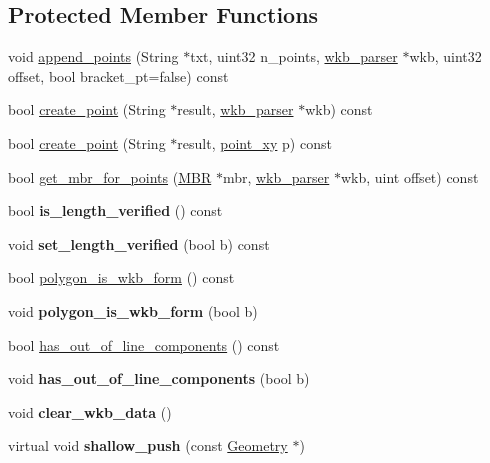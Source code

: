 \subsection*{Protected Member Functions}
\begin{DoxyCompactItemize}
\item 
void \mbox{\hyperlink{classGeometry_ad66be02e381cdb64b19e2b1e9072311f}{append\+\_\+points}} (String $\ast$txt, uint32 n\+\_\+points, \mbox{\hyperlink{classGeometry_1_1wkb__parser}{wkb\+\_\+parser}} $\ast$wkb, uint32 offset, bool bracket\+\_\+pt=false) const
\item 
bool \mbox{\hyperlink{classGeometry_a59686d5382a6cd3a691d18e24d2e2811}{create\+\_\+point}} (String $\ast$result, \mbox{\hyperlink{classGeometry_1_1wkb__parser}{wkb\+\_\+parser}} $\ast$wkb) const
\item 
bool \mbox{\hyperlink{classGeometry_ab2023acb5c6e5eaf434830c03a461072}{create\+\_\+point}} (String $\ast$result, \mbox{\hyperlink{classpoint__xy}{point\+\_\+xy}} p) const
\item 
bool \mbox{\hyperlink{classGeometry_a35ea9c1dd07e14bf7f414433e193461a}{get\+\_\+mbr\+\_\+for\+\_\+points}} (\mbox{\hyperlink{structMBR}{M\+BR}} $\ast$mbr, \mbox{\hyperlink{classGeometry_1_1wkb__parser}{wkb\+\_\+parser}} $\ast$wkb, uint offset) const
\item 
\mbox{\label{classGeometry_af9ad5d486b7b31a8289522b0d0612124}} 
bool {\bfseries is\+\_\+length\+\_\+verified} () const
\item 
\mbox{\label{classGeometry_a856b3a9315e460890338467aad16da68}} 
void {\bfseries set\+\_\+length\+\_\+verified} (bool b) const
\item 
bool \mbox{\hyperlink{classGeometry_a0b03ccd55d98e9f0c8ccf44f5d4c1ffc}{polygon\+\_\+is\+\_\+wkb\+\_\+form}} () const
\item 
\mbox{\label{classGeometry_ab7c4a477cbfb7efd69d63d42fb74507f}} 
void {\bfseries polygon\+\_\+is\+\_\+wkb\+\_\+form} (bool b)
\item 
bool \mbox{\hyperlink{classGeometry_a4b4f4a21518909f1427a82ac17ef4f6e}{has\+\_\+out\+\_\+of\+\_\+line\+\_\+components}} () const
\item 
\mbox{\label{classGeometry_a4f7f515e3c8357a2e18e0099ac532f2a}} 
void {\bfseries has\+\_\+out\+\_\+of\+\_\+line\+\_\+components} (bool b)
\item 
\mbox{\label{classGeometry_a4b6620ec8e9cae00155553f39213a320}} 
void {\bfseries clear\+\_\+wkb\+\_\+data} ()
\item 
\mbox{\label{classGeometry_a29800e226535fa8461e94cc6aa8d4e6d}} 
virtual void {\bfseries shallow\+\_\+push} (const \mbox{\hyperlink{classGeometry}{Geometry}} $\ast$)
\end{DoxyCompactItemize}
